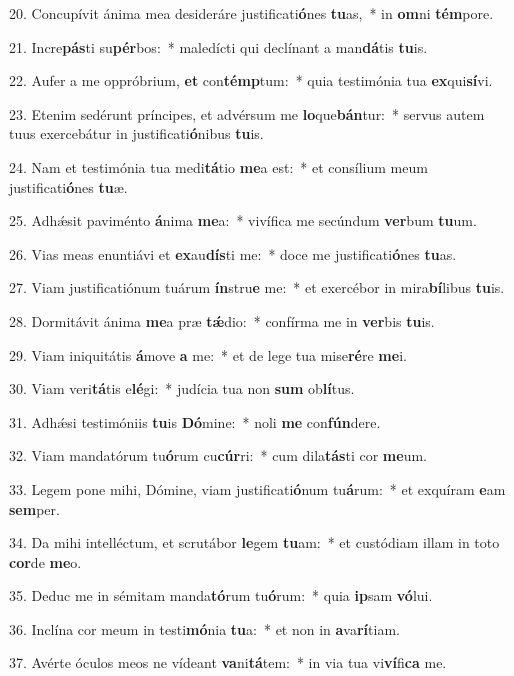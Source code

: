 20. Concupívit ánima mea desideráre justificati\textbf{ó}nes \textbf{tu}as,~*  in \textbf{om}ni \textbf{tém}pore.\

21. Incre\textbf{pás}ti su\textbf{pér}bos:~*  maledícti qui declínant a man\textbf{dá}tis \textbf{tu}is.\

22. Aufer a me oppróbrium, \textbf{et} con\textbf{témp}tum:~*  quia testimónia tua \textbf{ex}qui\textbf{sí}vi.\

23. Etenim sedérunt príncipes, et advérsum me \textbf{lo}que\textbf{bán}tur:~*  servus autem tuus exercebátur in justificati\textbf{ó}nibus \textbf{tu}is.\

24. Nam et testimónia tua medi\textbf{tá}tio \textbf{me}a est:~*  et consílium meum justificati\textbf{ó}nes \textbf{tu}æ.\

25. Adhǽsit paviménto \textbf{á}nima \textbf{me}a:~*  vivífica me secúndum \textbf{ver}bum \textbf{tu}um.\

26. Vias meas enuntiávi et \textbf{ex}au\textbf{dís}ti me:~*  doce me justificati\textbf{ó}nes \textbf{tu}as.\

27. Viam justificatiónum tuárum \textbf{ín}stru\textbf{e} me:~*  et exercébor in mira\textbf{bí}libus \textbf{tu}is.\

28. Dormitávit ánima \textbf{me}a præ \textbf{tǽ}dio:~*  confírma me in \textbf{ver}bis \textbf{tu}is.\

29. Viam iniquitátis \textbf{á}move \textbf{a} me:~*  et de lege tua mise\textbf{ré}re \textbf{me}i.\

30. Viam veri\textbf{tá}tis e\textbf{lé}gi:~*  judícia tua non \textbf{sum} ob\textbf{lí}tus.\

31. Adhǽsi testimóniis \textbf{tu}is \textbf{Dó}mine:~*  noli \textbf{me} con\textbf{fún}dere.\

32. Viam mandatórum tu\textbf{ó}rum cu\textbf{cúr}ri:~*  cum dila\textbf{tás}ti cor \textbf{me}um.\

33. Legem pone mihi, Dómine, viam justificati\textbf{ó}num tu\textbf{á}rum:~*  et exquíram \textbf{e}am \textbf{sem}per.\

34. Da mihi intelléctum, et scrutábor \textbf{le}gem \textbf{tu}am:~*  et custódiam illam in toto \textbf{cor}de \textbf{me}o.\

35. Deduc me in sémitam manda\textbf{tó}rum tu\textbf{ó}rum:~*  quia \textbf{ip}sam \textbf{vó}lui.\

36. Inclína cor meum in testi\textbf{mó}nia \textbf{tu}a:~*  et non in \textbf{a}va\textbf{rí}tiam.\

37. Avérte óculos meos ne vídeant \textbf{va}ni\textbf{tá}tem:~*  in via tua vi\textbf{ví}fi\textbf{ca} me.\

